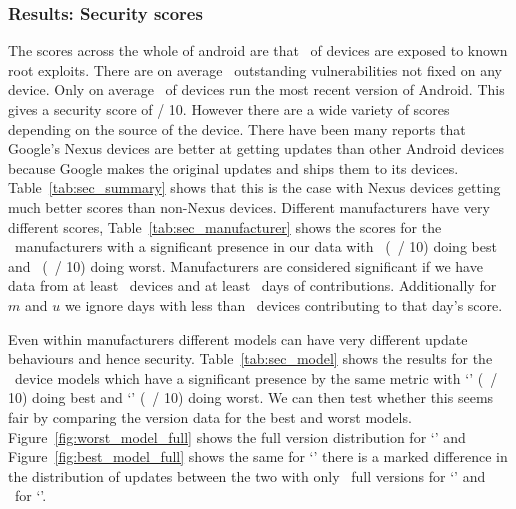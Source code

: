 \subsubsection{Results: Security scores}
The scores across the whole of android are that \daMeanInsecurityPerc\ of devices are exposed to known root exploits.
There are on average \daMeanOutstandingVulnerabilities\ outstanding vulnerabilities not fixed on any device.
Only on average \daUpdatednessPerc\ of devices run the most recent version of Android.
This gives a security score of \daSecurityScore / 10.
\daTabSecScoressummary
However there are a wide variety of scores depending on the source of the device.
There have been many reports that Google's Nexus devices are better at getting updates than other Android devices because Google makes the original updates and ships them to its devices.
Table~\ref{tab:sec_summary} shows that this is the case with Nexus devices getting much better scores than non-Nexus devices.
\daTabSecScoresmanufacturer
Different manufacturers have very different scores, Table~\ref{tab:sec_manufacturer} shows the scores for the \daNumSigManufacturers\ manufacturers with a significant presence in our data with \daSecScoreBestmanufacturer\ (\daSecScoreBestmanufacturerScore\ / 10) doing best and \daSecScoreWorstmanufacturer\ (\daSecScoreWorstmanufacturerScore\ / 10) doing worst.
Manufacturers are considered significant if we have data from at least \daSigNumDevices\ devices and at least \daSigNumDeviceDays\ days of contributions.
Additionally for $m$ and $u$ we ignore days with less than \daSigNumDevicesDay\ devices contributing to that day's score.

\daTabSecScoresmodel
Even within manufacturers different models can have very different update behaviours and hence security.
Table~\ref{tab:sec_model} shows the results for the \daNumSigModels\ device models which have a significant presence by the same metric with `\daSecScoreBestmodel' (\daSecScoreBestmodelScore\ / 10) doing best and `\daSecScoreWorstmodel' (\daSecScoreWorstmodelScore\ / 10) doing worst.
We can then test whether this seems fair by comparing the version data for the best and worst models.
Figure~\ref{fig:worst_model_full} shows the full version distribution for `\daSecScoreWorstmodel' and Figure~\ref{fig:best_model_full} shows the same for `\daSecScoreBestmodel' there is a marked difference in the distribution of updates between the two with only \daSecScoreWorstmodelNumFullVersions\ full versions for `\daSecScoreWorstmodel' and \daSecScoreBestmodelNumFullVersions\ for `\daSecScoreBestmodel'.

